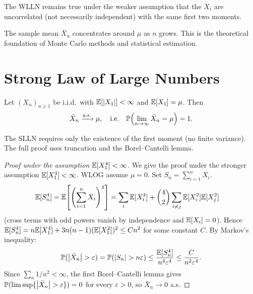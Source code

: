 \begin{remark}
The WLLN remains true under the weaker assumption that the $X_i$ are uncorrelated
(not necessarily independent) with the same first two moments.
\end{remark}

\begin{intuition}[title=\textbf{Meaning of the WLLN}]
The sample mean $\bar{X}_n$ concentrates around $\mu$ as $n$ grows. This is the
theoretical foundation of Monte Carlo methods and statistical estimation.
\end{intuition}

\section{Strong Law of Large Numbers}

\begin{theorem}
\label{thm:slln}
Let $(X_n)_{n \geq 1}$ be i.i.d.\ with $\mathbb{E}[\left| X_1 \right|] < \infty$ and
$\mathbb{E}[X_1] = \mu$. Then
\[
    \bar{X}_n \xrightarrow{\text{a.s.}} \mu, \quad \text{i.e.} \quad
    \mathbb{P}\!\left(\lim_{n \to \infty} \bar{X}_n = \mu\right) = 1.
\]
\end{theorem}

\begin{remark}
The SLLN requires only the existence of the first moment (no finite variance).
The full proof uses truncation and the Borel--Cantelli lemma.
\end{remark}

\begin{proof}[Proof under the assumption $\mathbb{E}\lbrack X_1^4\rbrack < \infty$]
We give the proof under the stronger assumption $\mathbb{E}[X_1^4] < \infty$.
WLOG assume $\mu = 0$. Set $S_n = \sum_{i=1}^n X_i$.
\begin{align*}
    \mathbb{E}[S_n^4] &= \mathbb{E}\!\left[\left(\sum_{i=1}^n X_i\right)^4\right]
    = \sum_i \mathbb{E}[X_i^4] + \binom{4}{2}\sum_{i \neq j}\mathbb{E}[X_i^2]\mathbb{E}[X_j^2]
\end{align*}
(cross terms with odd powers vanish by independence and $\mathbb{E}[X_i]=0$).
Hence $\mathbb{E}[S_n^4] = n\mathbb{E}[X_1^4] + 3n(n-1)(\mathbb{E}[X_1^2])^2 \leq Cn^2$ for some
constant $C$. By Markov's inequality:
\[
    \mathbb{P}(\left| \bar{X}_n \right| > \varepsilon)
    = \mathbb{P}(\left| S_n \right| > n\varepsilon)
    \leq \frac{\mathbb{E}[S_n^4]}{n^4\varepsilon^4}
    \leq \frac{C}{n^2\varepsilon^4}.
\]
Since $\sum_n 1/n^2 < \infty$, the first Borel--Cantelli lemma gives
$\mathbb{P}(\limsup\{\left| \bar{X}_n \right| > \varepsilon\}) = 0$ for every $\varepsilon > 0$,
so $\bar{X}_n \to 0$ a.s.
\end{proof}

